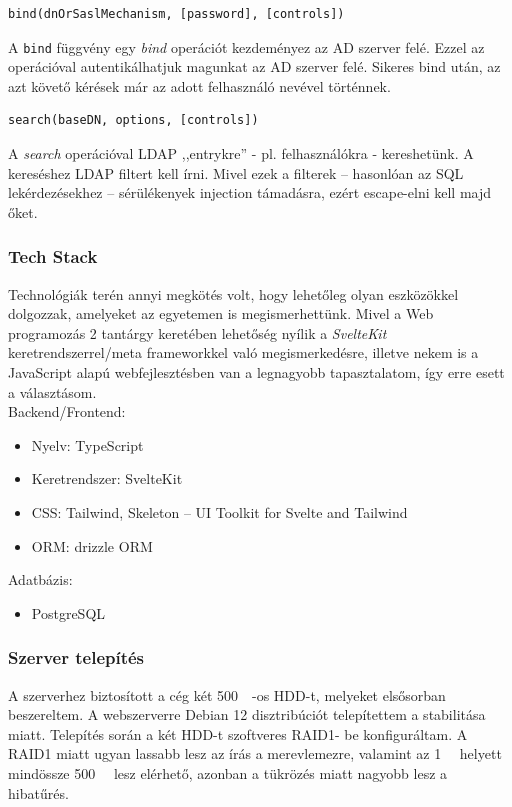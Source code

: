 \documentclass[a4paper]{article}
\newcommand{\inlts}[1]{\texttt{#1}}
\begin{document}
\FloatBarrier
\begin{verbatim}
bind(dnOrSaslMechanism, [password], [controls])
\end{verbatim}

A \inlts{bind} függvény egy \emph{bind} operációt kezdeményez az AD szerver felé. Ezzel az operációval
autentikálhatjuk magunkat az AD szerver felé. Sikeres bind után, az azt követő kérések már az adott
felhasználó nevével történnek.

\FloatBarrier
\begin{verbatim}
search(baseDN, options, [controls])
\end{verbatim}

A \emph{search} operációval LDAP ,,entrykre'' - pl. felhasználókra - kereshetünk. A kereséshez LDAP filtert kell
írni. Mivel ezek a filterek -- hasonlóan az SQL lekérdezésekhez -- sérülékenyek injection támadásra, ezért
escape-elni kell majd őket.

\subsubsection*{Tech Stack}
Technológiák terén annyi megkötés volt, hogy lehetőleg olyan eszközökkel dolgozzak, amelyeket az
egyetemen is megismerhettünk. Mivel a Web programozás 2 tantárgy keretében lehetőség nyílik a
\emph{SvelteKit} keretrendszerrel/meta frameworkkel való megismerkedésre, illetve nekem is a JavaScript
alapú webfejlesztésben van a legnagyobb tapasztalatom, így erre esett a választásom.\\

Backend/Frontend:
\begin{itemize}
  \item Nyelv: TypeScript
  \item Keretrendszer: SvelteKit
  \item CSS: Tailwind, Skeleton – UI Toolkit for Svelte and Tailwind
  \item ORM: drizzle ORM
\end{itemize}

Adatbázis:
\begin{itemize}
  \item PostgreSQL
\end{itemize}

\subsubsection*{Szerver telepítés}
A szerverhez biztosított a cég két \qty{500}{\giga\byte}-os HDD-t, melyeket elsősorban beszereltem. A webszerverre
Debian 12 disztribúciót telepítettem a stabilitása miatt. Telepítés során a két HDD-t szoftveres RAID1-
be konfiguráltam. A RAID1 miatt ugyan lassabb lesz az írás a merevlemezre, valamint az  \qty{1}{\tera\byte} helyett
mindössze \qty{500}{\giga\byte} lesz elérhető, azonban a tükrözés miatt nagyobb lesz a hibatűrés.
\end{document}
